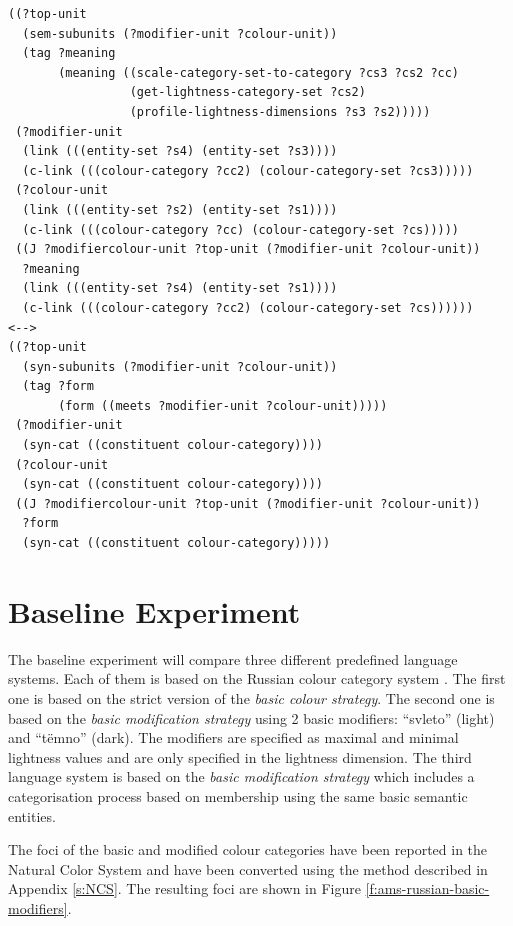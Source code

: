 \footnotesize
\begin{Verbatim}[frame=lines, label=ModifierColour rule]
((?top-unit
  (sem-subunits (?modifier-unit ?colour-unit))
  (tag ?meaning
       (meaning ((scale-category-set-to-category ?cs3 ?cs2 ?cc)
                 (get-lightness-category-set ?cs2)
                 (profile-lightness-dimensions ?s3 ?s2)))))
 (?modifier-unit
  (link (((entity-set ?s4) (entity-set ?s3))))
  (c-link (((colour-category ?cc2) (colour-category-set ?cs3)))))
 (?colour-unit
  (link (((entity-set ?s2) (entity-set ?s1))))
  (c-link (((colour-category ?cc) (colour-category-set ?cs)))))
 ((J ?modifiercolour-unit ?top-unit (?modifier-unit ?colour-unit))
  ?meaning
  (link (((entity-set ?s4) (entity-set ?s1))))
  (c-link (((colour-category ?cc2) (colour-category-set ?cs))))))
<-->
((?top-unit
  (syn-subunits (?modifier-unit ?colour-unit))
  (tag ?form 
       (form ((meets ?modifier-unit ?colour-unit)))))
 (?modifier-unit 
  (syn-cat ((constituent colour-category))))
 (?colour-unit 
  (syn-cat ((constituent colour-category))))
 ((J ?modifiercolour-unit ?top-unit (?modifier-unit ?colour-unit))
  ?form
  (syn-cat ((constituent colour-category)))))
\end{Verbatim}
\normalsize

\section{Baseline Experiment}

The baseline experiment will compare three different predefined language
systems. Each of them is based on the Russian colour category system
\citep{safuanova07russian}. The first one is based on the strict
version of the \emph{basic colour strategy}. The second one is based
on the \emph{basic modification strategy} using 2 basic
modifiers: ``svleto'' (light) and ``t\"emno'' (dark). The modifiers
are specified as maximal and minimal lightness values and are only
specified in the lightness dimension. The third language system is
based on the \emph{basic modification strategy} which includes a
categorisation process based on membership using the same basic
semantic entities.

The foci of the basic and modified colour categories have been
reported in the Natural Color System \citep{safuanova07russian} and
have been converted using the method described in Appendix
\ref{s:NCS}. The resulting foci are shown in Figure
\ref{f:ams-russian-basic-modifiers}.


